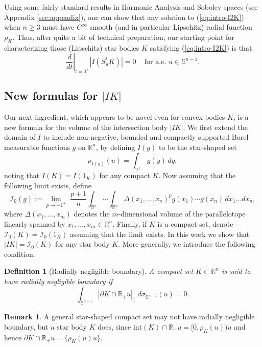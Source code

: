 \documentclass[11pt]{article}
\newtheorem{defn}[thm]{Definition}
\theoremstyle{definition}
\newtheorem{rem}[thm]{\textbf{Remark}}
\theoremstyle{proof}
\DeclareMathOperator{\+}{\mathop{\tilde{+}}}
\newcommand{\R}{\mathbb{R}}
\renewcommand{\S}{\mathbb{S}}
\newcommand{\I}{\mathcal{I}}
\numberwithin{equation}{section}
\numberwithin{equation}{section}
\begin{document}
\smallskip

Using some fairly standard results in Harmonic Analysis and Sobolev spaces (see Appendix \ref{sec:appendix}), one can show that any solution to (\ref{eq:intro-I2K}) when $n \geq 3$ must have $C^\infty$ smooth (and in particular Lipschitz) radial function $\rho_K$. Thus, after quite a bit of technical preparation, our starting point for characterizing those (Lipschitz) star bodies $K$ satisfying (\ref{eq:intro-I2K}) is  that
\begin{equation} \label{eq:intro-dIdt}
\left . \frac{d}{dt} \right |_{t=0^+} |I (S_u^t K)|  = 0 \;\;\;  \text{ for a.e. } u \in \S^{n-1} . 
\end{equation}
 

\subsection{New formulas for $|I K|$}

Our next ingredient, which appears to be novel even for convex bodies $K$, is a new formula for the volume of the intersection body $| I K|$. We first extend the domain of $I$ to include non-negative, bounded and compactly supported Borel measurable functions $g$ on $\R^n$, by defining $I(g)$ to be the star-shaped set 
\[
\rho_{I(g)}(u) = \int_{u^{\perp}} g(y) \, dy ,
\]
noting that $I(K) = I(1_K)$ for any compact $K$. 
Now assuming that the following limit exists, define
\begin{equation} \label{eq:intro-I0}
\I_0(g) := \lim_{p \rightarrow -1^+} \; \frac{p+1}{n} \int_{\R^n} \cdots \int_{\R^n} \Delta(x_1,\ldots,x_n)^{p} g(x_1) \cdots g(x_n) \, dx_1 \ldots dx_n ,
\end{equation}
where $\Delta(x_1,\ldots,x_m)$ denotes the $m$-dimensional volume of the parallelotope linearly spanned by $x_1,\ldots,x_m \in \R^n$. 
Finally, if $K$ is a compact set, denote $\I_0(K) = \I_0(1_K)$ assuming that the limit exists. In this work we show that $| I K | = \I_0(K)$ for any star body $K$. More generally, we introduce the following condition.

\begin{defn}[Radially negligible boundary] \label{def:intro-radially-negligible}
A compact set $K \subset \R^n$ is said to have radially negligible boundary if
\[
\int_{\S^{n-1}} |\partial K \cap \R_+ u|_1 \;  d\sigma_{\S^{n-1}}(u) =  0 .
\]
\end{defn}
\begin{rem} \label{rem:intro-radially-negligible}
A general star-shaped compact set may not have radially negligible boundary, but a star body $K$ does, since $\text{int}(K) \cap \R_+ u =  [0,\rho_K(u)) u$ and hence $\partial K \cap \R_+ u = \{\rho_K(u) u\}$.  
\end{rem}
\end{document}

